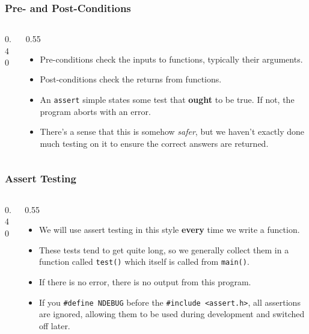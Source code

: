 

\begin{frame}[fragile]
\frametitle{Pre- and Post-Conditions}
\begin{columns}

\begin{column}{0.40\textwidth}

\end{column}

\pause
\begin{column}{0.55\textwidth}
\begin{itemize}[<+->]
\item Pre-conditions check the inputs to functions, typically their arguments.
\item Post-conditions check the returns from functions.
\item An {\tt assert} simple states some test that {\bf ought} to be true. If not, the
program aborts with an error.
\item There's a sense that this is somehow {\it safer}, but we haven't exactly done much testing on it to ensure the correct answers are returned.
\end{itemize}
\end{column}

\end{columns}
\end{frame}



\begin{frame}[fragile]
\frametitle{Assert Testing}
\begin{columns}

\begin{column}{0.40\textwidth}

\end{column}

\pause
\begin{column}{0.55\textwidth}
\begin{itemize}[<+->]
\item We will use assert testing in this style {\bf every} time we write a function.
\item These tests tend to get quite long, so we generally collect them in a function called {\tt test()} which itself is called from {\tt main()}.
\item If there is no error, there is no output from this program.
\item If you \verb^#define NDEBUG^ before the {\tt \#include <assert.h>}, all assertions are ignored, allowing them to be used during development and switched off later.
\end{itemize}
\end{column}

\end{columns}
\end{frame}

